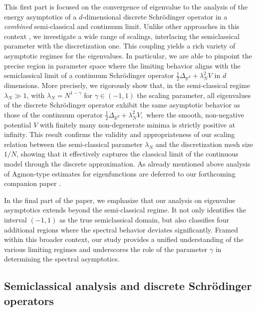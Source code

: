 \documentclass[12pt, reqno]{amsart}
\theoremstyle{definition}
\numberwithin{equation}{section}
\begin{document}
This first part is focused on the convergence of eigenvalue to the analysis of the energy asymptotics of a $d$-dimensional discrete Schr\"{o}dinger operator in a \emph{combined} semi-classical and continuum limit. Unlike other approaches in this context \cite{Isozaki_Jensen_2022,Kameoka_2023,Nakamura_2021,Klein_Rosenberger_2008,Klein_Rosenberger_2009}, we investigate a wide range of scalings, interlacing the semiclassical parameter with the discretization one. This coupling yields a rich variety of asymptotic regimes for the eigenvalues. In particular, we are able to pinpoint the precise region in parameter space where the limiting behavior aligns with the semiclassical limit of a continuum Schr\"{o}dinger operator $ \frac{1}{2} \Delta_{\mathbb{R}^d} + \lambda_N^2 V$ in $d$ dimensions.
More precisely, we rigorously show that, in the semi-classical regime $\lambda_N \gg 1$, with $\lambda_N = N^{1 - \gamma}$ for $\gamma \in (-1,1)$ the scaling parameter, all eigenvalues of the discrete Schr\"{o}dinger operator exhibit the same asymptotic behavior as those of the continuum operator $ \frac{1}{2} \Delta_{\mathbb{R}^d} + \lambda_N^2 V,$
where the smooth, non-negative potential $V$ with finitely many non-degenerate minima is strictly positive at infinity. This result confirms the validity and appropriateness of our scaling relation between the semi-classical parameter $\lambda_N$ and the discretization mesh size $1/N$, showing that it effectively captures the classical limit of the continuous model through the discrete approximation. As already mentioned above analysis of Agmon-type estimates for eigenfunctions are deferred to our forthcoming companion paper \cite{Keller_Pettinari_Ven_Part2}.

In the final part of the paper, we emphasize that our analysis on eigenvalue asymptotics extends beyond the semi-classical regime. It not only identifies the interval $(-1,1)$ as the true semiclassical domain, but also classifies four additional regions where the spectral behavior deviates significantly. Framed within this broader context, our study provides a unified understanding of the various limiting regimes and underscores the role of the parameter $\gamma$ in determining the spectral asymptotics.




\subsection{Semiclassical analysis and discrete Schr\"{o}dinger operators}
\end{document}
